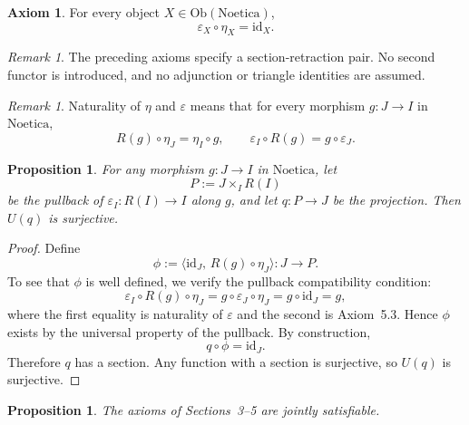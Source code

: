\documentclass[11pt]{amsart}
\numberwithin{equation}{section}
\newtheorem{proposition}[theorem]{Proposition}
\theoremstyle{definition}
\newtheorem{axiom}[theorem]{Axiom}
\theoremstyle{remark}
\newtheorem{remark}[theorem]{Remark}
\newcommand{\Noetica}{\mathrm{Noetica}}
\newcommand{\id}{\mathrm{id}}
\begin{document}
\begin{axiom}
For every object \(X \in \mathrm{Ob}(\Noetica)\),
\[
\varepsilon_X \circ \eta_X = \id_X.
\]
\end{axiom}

\begin{remark}
The preceding axioms specify a section-retraction pair. No second functor is introduced, and no adjunction or triangle identities are assumed.
\end{remark}

\begin{remark}
Naturality of \(\eta\) and \(\varepsilon\) means that for every morphism \(g : J \to I\) in \(\Noetica\),
\[
R(g)\circ \eta_J = \eta_I \circ g,
\qquad
\varepsilon_I \circ R(g) = g \circ \varepsilon_J.
\]
\end{remark}

\begin{proposition}\label{prop:rpm-pullback}
For any morphism \(g : J \to I\) in \(\Noetica\), let
\[
P := J \times_I R(I)
\]
be the pullback of \(\varepsilon_I : R(I) \to I\) along \(g\), and let \(q : P \to J\) be the projection. Then \(U(q)\) is surjective.
\end{proposition}

\begin{proof}
Define
\[
\phi := \langle \id_J,\, R(g)\circ \eta_J\rangle : J \to P.
\]
To see that \(\phi\) is well defined, we verify the pullback compatibility condition:
\[
\varepsilon_I \circ R(g)\circ \eta_J
= g \circ \varepsilon_J \circ \eta_J
= g \circ \id_J
= g,
\]
where the first equality is naturality of \(\varepsilon\) and the second is Axiom~5.3. Hence \(\phi\) exists by the universal property of the pullback. By construction,
\[
q \circ \phi = \id_J.
\]
Therefore \(q\) has a section. Any function with a section is surjective, so \(U(q)\) is surjective.
\end{proof}

\begin{proposition}\label{prop:finite-model}
The axioms of Sections~3--5 are jointly satisfiable.
\end{proposition}
\end{document}
